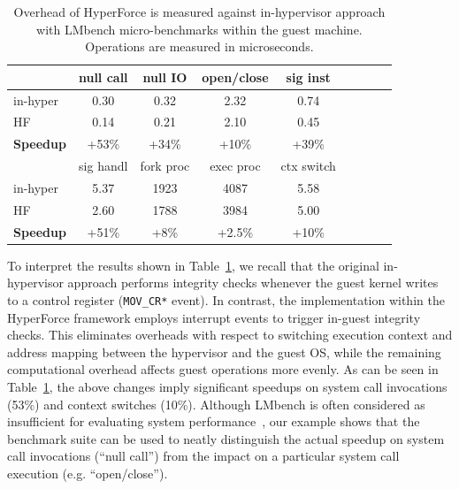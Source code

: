 \begin{table}[htdp]
\caption{Overhead of HyperForce is measured against in-hypervisor approach with
LMbench micro-benchmarks within the guest machine. Operations are measured in microseconds.}
\begin{center}
\begin{tabular}{| l | c | c | c | c | c | c | c | c |  }
\hline
  ~            & null call  & null IO & open/close & sig inst   \\  
\hline
in-hyper & 0.30 & 0.32 & 2.32 & 0.74   \\
HF    & 0.14 & 0.21 & 2.10 & 0.45  \\  
\hline
\bf{Speedup}      &  +53\%   & +34\%    &  +10\%    & +39\%      \\
\hline
\hline

~ & sig handl & fork proc & exec proc & ctx switch \\
\hline
in-hyper 			& 5.37 & 1923 & 4087 & 5.58 \\
HF 		& 2.60 & 1788 & 3984 & 5.00 \\

\hline
\bf{Speedup}			& +51\%    & +8\%       & +2.5\%     &  +10\% \\
\hline

\end{tabular}
\end{center}
\label{guestmicro}
\end{table}%



To interpret the results shown in Table~\ref{guestmicro}, we recall that the original in-hypervisor approach performs integrity checks whenever the guest kernel writes to a control register (\texttt{MOV\_CR*} event). 
%
In contrast, the implementation within the HyperForce framework employs interrupt events to trigger in-guest integrity checks. This eliminates overheads with respect to switching execution context and address mapping between the hypervisor and the guest OS, while the remaining computational overhead affects guest operations more evenly. As can be seen in Table~\ref{guestmicro}, the above changes imply significant speedups on system call invocations (53\%) and context switches (10\%). Although LMbench is often considered as insufficient for evaluating system performance~\cite{lmbenchevil}, our example shows that the benchmark suite can be used to neatly distinguish the actual speedup on system call invocations (\enquote{null call}) from the impact on a particular system call execution (e.g. \enquote{open/close}).

